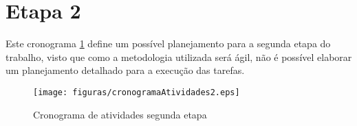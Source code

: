 \section{Etapa 2}
Este cronograma \ref{cronograma2} define um possível planejamento para a segunda etapa do trabalho, visto que como a metodologia utilizada será ágil, não é possível elaborar um planejamento detalhado para a execução das tarefas.
\begin{figure}[H]
    \centering
    \label{cronograma2}
    \texttt{[image: figuras/cronogramaAtividades2.eps]}
    \caption{Cronograma de atividades segunda etapa}
\end{figure}
